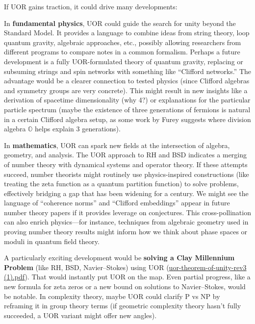\documentclass[12pt]{article}
\begin{document}
If UOR gains traction, it could drive many developments:

\medskip

In \textbf{fundamental physics}, UOR could guide the search for unity beyond the Standard Model. It provides a language to combine ideas from string theory, loop quantum gravity, algebraic approaches, etc., possibly allowing researchers from different programs to compare notes in a common formalism. Perhaps a future development is a fully UOR-formulated theory of quantum gravity, replacing or subsuming strings and spin networks with something like ``Clifford networks.'' The advantage would be a clearer connection to tested physics (since Clifford algebras and symmetry groups are very concrete). This might result in new insights like a derivation of spacetime dimensionality (why 4?) or explanations for the particular particle spectrum (maybe the existence of three generations of fermions is natural in a certain Clifford algebra setup, as some work by Furey suggests where division algebra $\mathbb{O}$ helps explain 3 generations).

\medskip

In \textbf{mathematics}, UOR can spark new fields at the intersection of algebra, geometry, and analysis. The UOR approach to RH and BSD indicates a merging of number theory with dynamical systems and operator theory. If these attempts succeed, number theorists might routinely use physics-inspired constructions (like treating the zeta function as a quantum partition function) to solve problems, effectively bridging a gap that has been widening for a century. We might see the language of ``coherence norms'' and ``Clifford embeddings'' appear in future number theory papers if it provides leverage on conjectures. This cross-pollination can also enrich physics---for instance, techniques from algebraic geometry used in proving number theory results might inform how we think about phase spaces or moduli in quantum field theory.

\medskip

A particularly exciting development would be \textbf{solving a Clay Millennium Problem} (like RH, BSD, Navier--Stokes) using UOR (\href{file://file-CJBWhjR1XERgfPCpnf5UAs#:~:text=Applications%20to%20the%20Riemann%20Hypothesis%2C,the%20scope%20of%20the%20method}{uor-theorem-of-unity-rev3 (1).pdf}). That would instantly put UOR on the map. Even partial progress, like a new formula for zeta zeros or a new bound on solutions to Navier--Stokes, would be notable. In complexity theory, maybe UOR could clarify P vs NP by reframing it in group theory terms (if geometric complexity theory hasn’t fully succeeded, a UOR variant might offer new angles).
\end{document}
